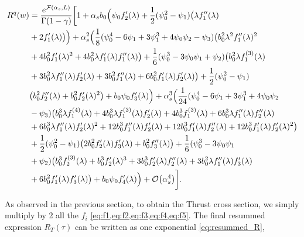 \documentclass[../Tesi_Jiahao_Miao_986136.tex]{subfiles}
\begin{document}
\begin{align}\label{eq:Rw final expansion}
        R^q(w) &= \frac{e^{\mathcal{F}(\alpha_s,L)}}{\Gamma(1-\gamma)} \biggl[ 1 + \alpha_s b_0 \Bigl( \psi_0 f_2'(\lambda )  + \frac{1}{2} (\psi_0^2-\psi_1)\bigl( \lambda  f_1''(\lambda ) \\
        &+2  f_1'(\lambda )\bigr)\Bigr) + \alpha_s^2 \Bigl(\frac{1}{8} (\psi_0^4 -6 \psi_1 + 3\psi_1^3 +4\psi_0\psi_2 -\psi_3) \bigl(b_0^2 \lambda ^2 f_1''(\lambda )^2\nonumber\\
        &+4 b_0^2 f_1'(\lambda )^2 +4 b_0^2 \lambda  f_1'(\lambda ) f_1''(\lambda )\bigr)+\frac{1}{6} (\psi_0^3 -3 \psi_0\psi_1+\psi_2) \bigl(b_0^2 \lambda  f_1^{(3)}(\lambda )\nonumber\\
        &+ 3 b_0^2 \lambda  f_1''(\lambda ) f_2'(\lambda )+3 b_0^2 f_1''(\lambda )+6 b_0^2 f_1'(\lambda ) f_2'(\lambda )\bigr)+\frac{1}{2} (\psi_0^2-\psi_1) \nonumber\\
        &\bigl(b_0^2 f_2''(\lambda ) +b_0^2 f_2'(\lambda )^2\bigr) + b_0 \psi_0 f_3'(\lambda )\Bigr) + \alpha_s^3 \Bigl(\frac{1}{24} (\psi_0^4 -6 \psi_1 + 3\psi_1^3 +4\psi_0\psi_2 \nonumber\\
        &-\psi_3) \bigl(b_0^3 \lambda  f_1^{(4)}(\lambda ) +4 b_0^3 \lambda  f_1^{(3)}(\lambda ) f_2'(\lambda ) + 4 b_0^3 f_1^{(3)}(\lambda )+6 b_0^3 \lambda  f_1''(\lambda ) f_2''(\lambda ) \nonumber\\
        &+ 6 b_0^3 \lambda  f_1''(\lambda ) f_2'(\lambda )^2 +12 b_0^3 f_1''(\lambda ) f_2'(\lambda )+12 b_0^3 f_1'(\lambda ) f_2''(\lambda ) + 12 b_0^3 f_1'(\lambda ) f_2'(\lambda )^2\bigr) \nonumber\\
        &+ \frac{1}{2} (\psi_0^2-\psi_1) \bigl(2 b_0^2 f_2'(\lambda ) f_3'(\lambda )+b_0^2 f_3''(\lambda )\bigr) + \frac{1}{6} (\psi_0^3 -3 \psi_0\psi_1\nonumber\\
        &+\psi_2) \bigl(b_0^3 f_2^{(3)}(\lambda )+b_0^3 f_2'(\lambda )^3 +3 b_0^3 f_2'(\lambda ) f_2''(\lambda )+3 b_0^2 \lambda  f_1''(\lambda ) f_3'(\lambda )\nonumber \\
        &+6 b_0^2 f_1'(\lambda ) f_3'(\lambda )\bigr) + b_0 \psi_0 f_4'(\lambda ) \Bigr) + \order{\alpha_s^4} \biggr]\nonumber.
\end{align}

As observed in the previous section, to obtain the Thrust cross section, we simply multiply by 2 all the $f_i$  \cref{eq:f1,eq:f2,eq:f3,eq:f4,eq:f5}. The final resummed expression $R_T(\tau)$ can be written 
as one exponential \cref{eq:resummed_R}, 
\end{document}
